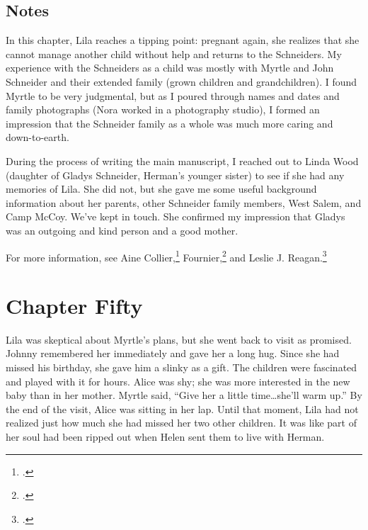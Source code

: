 \documentclass[
  american,
  letterpaper,
]{book}
\begin{document}
\section{Notes}\label{notes-51}

In this chapter, Lila reaches a tipping point: pregnant again, she
realizes that she cannot manage another child without help and returns
to the Schneiders. My experience with the Schneiders as a child was
mostly with Myrtle and John Schneider and their extended family (grown
children and grandchildren). I found Myrtle to be very judgmental, but
as I poured through names and dates and family photographs (Nora worked
in a photography studio), I formed an impression that the Schneider
family as a whole was much more caring and down-to-earth.

During the process of writing the main manuscript, I reached out to
Linda Wood (daughter of Gladys Schneider, Herman's younger sister) to
see if she had any memories of Lila. She did not, but she gave me some
useful background information about her parents, other Schneider family
members, West Salem, and Camp McCoy. We've kept in touch. She confirmed
my impression that Gladys was an outgoing and kind person and a good
mother.

For more information, see Aine Collier,\footnote{.}
Fournier,\footnote{.} and
Leslie J. Reagan.\footnote{.}


\chapter{Chapter Fifty}\label{chapter-fifty}

Lila was skeptical about Myrtle's plans, but she went back to visit as
promised. Johnny remembered her immediately and gave her a long hug.
Since she had missed his birthday, she gave him a slinky as a gift. The
children were fascinated and played with it for hours. Alice was shy;
she was more interested in the new baby than in her mother. Myrtle said,
``Give her a little time\ldots she'll warm up.'' By the end of the
visit, Alice was sitting in her lap. Until that moment, Lila had not
realized just how much she had missed her two other children. It was
like part of her soul had been ripped out when Helen sent them to live
with Herman.
\end{document}
